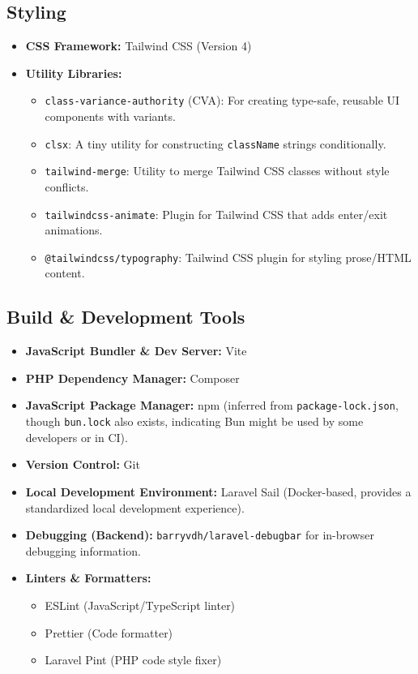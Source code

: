 \documentclass[12pt,a4paper]{article}
\begin{document}
\subsection*{Styling}

\begin{itemize}
    \item \textbf{CSS Framework:} Tailwind CSS (Version 4)
    \item \textbf{Utility Libraries:}
    \begin{itemize}
        \item \texttt{class-variance-authority} (CVA): For creating type-safe, reusable UI components with variants.
        \item \texttt{clsx}: A tiny utility for constructing \texttt{className} strings conditionally.
        \item \texttt{tailwind-merge}: Utility to merge Tailwind CSS classes without style conflicts.
        \item \texttt{tailwindcss-animate}: Plugin for Tailwind CSS that adds enter/exit animations.
        \item \texttt{@tailwindcss/typography}: Tailwind CSS plugin for styling prose/HTML content.
    \end{itemize}
\end{itemize}

\subsection*{Build \& Development Tools}

\begin{itemize}
    \item \textbf{JavaScript Bundler \& Dev Server:} Vite
    \item \textbf{PHP Dependency Manager:} Composer
    \item \textbf{JavaScript Package Manager:} npm (inferred from \texttt{package-lock.json}, though \texttt{bun.lock} also exists, indicating Bun might be used by some developers or in CI).
    \item \textbf{Version Control:} Git
    \item \textbf{Local Development Environment:} Laravel Sail (Docker-based, provides a standardized local development experience).
    \item \textbf{Debugging (Backend):} \texttt{barryvdh/laravel-debugbar} for in-browser debugging information.
    \item \textbf{Linters \& Formatters:}
    \begin{itemize}
        \item ESLint (JavaScript/TypeScript linter)
        \item Prettier (Code formatter)
        \item Laravel Pint (PHP code style fixer)
    \end{itemize}
\end{itemize}
\end{document}

